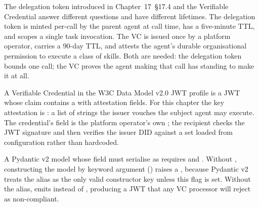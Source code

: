 The delegation token introduced in Chapter~17~\S17.4 and the Verifiable
Credential answer different questions and have different lifetimes. The
delegation token is minted per-call by the parent agent at call time, has
a five-minute TTL, and scopes a single task invocation. The VC is issued
once by a platform operator, carries a 90-day TTL, and attests the
agent's durable organisational permission to execute a class of skills.
Both are needed: the delegation token bounds one call; the VC proves the
agent making that call has standing to make it at all.

A Verifiable Credential in the W3C Data Model v2.0 JWT profile is a JWT
whose  claim contains a  with
attestation fields. For this chapter the key attestation is
: a list of  strings the issuer
vouches the subject agent may execute. The credential's 
field is the platform operator's own ; the recipient checks
the JWT signature and then verifies the issuer DID against a
 set loaded from configuration rather than
hardcoded.

\begin{notebox}
A Pydantic v2 model whose field must serialise as 
requires  and
. Without
, constructing the model by keyword
argument () raises a , because
Pydantic v2 treats the alias as the only valid constructor key unless
this flag is set. Without the alias, 
emits  instead of , producing a JWT
that any VC processor will reject as non-compliant.
\end{notebox}

